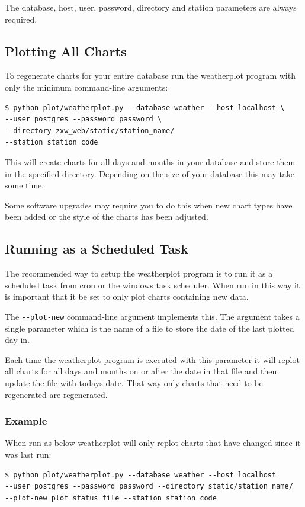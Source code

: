 \documentclass[a4paper,10pt,draft]{book}
\begin{document}
The database, host, user, password, directory and station parameters are always required.

\subsection{Plotting All Charts}

To regenerate charts for your entire database run the weatherplot program with only the minimum command-line arguments:

\begin{verbatim}
$ python plot/weatherplot.py --database weather --host localhost \
--user postgres --password password \
--directory zxw_web/static/station_name/
--station station_code
\end{verbatim}

This will create charts for all days and months in your database and store them in the specified directory. Depending on the size of your database this may take some time.

Some software upgrades may require you to do this when new chart types have been added or the style of the charts has been adjusted.

\subsection{Running as a Scheduled Task}

The recommended way to setup the weatherplot program is to run it as a scheduled task from cron or the windows task scheduler. When run in this way it is important that it be set to only plot charts containing new data.

The \verb|--plot-new| command-line argument implements this. The argument takes a single parameter which is the name of a file to store the date of the last plotted day in.

Each time the weatherplot program is executed with this parameter it will replot all charts for all days and months on or after the date in that file and then update the file with todays date. That way only charts that need to be regenerated are regenerated.

\subsubsection{Example}

When run as below weatherplot will only replot charts that have changed since it was last run:
\begin{verbatim}
$ python plot/weatherplot.py --database weather --host localhost
--user postgres --password password --directory static/station_name/
--plot-new plot_status_file --station station_code
\end{verbatim}
\end{document}
